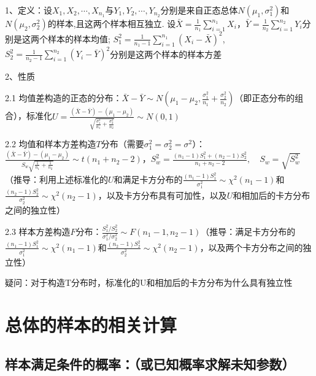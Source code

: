 1、定义：设$X_{1}, X_{2}, \cdots, X_{n_{1}}$与$Y_{1}, Y_{2}, \cdots,Y_{n_{2}}$分别是来自正态总体$N\left(\mu_{1}, \sigma_{1}^{2}\right)$和$N\left(\mu_{2}, \sigma_{2}^{2}\right)$的样本,且这两个样本相互独立. 设$\bar{X}=\frac{1}{n_{1}} \sum_{i=1}^{n_{1}} X_{i}$，$\bar{Y}=\frac{1}{n_{2}} \sum_{i=1}^{n_{2}} Y_{i}$分别是这两个样本的样本均值; $S_{1}^{2}=\frac{1}{n_{1}-1} \sum_{i=1}^{n_{1}}\left(X_{i}-\bar{X}\right)^{2}$, $S_{2}^{2}=\frac{1}{n_{2}-1} \sum_{i=1}^{n_{2}}\left(Y_{i}-\bar{Y}\right)^{2}$分别是这两个样本的样本方差

2、性质

2.1 均值差构造的正态的分布：$\bar{X}-\bar{Y} \sim N\left(\mu_{1}-\mu_{2}, \frac{\sigma_{1}^{2}}{n_{1}}+\frac{\sigma_{2}^{2}}{n_{2}}\right)$（即正态分布的组合），标准化$ U=\frac{(\bar{X}-\bar{Y})-\left(\mu_{1}-\mu_{2}\right)}{\sqrt{\frac{\sigma_{1}^{2}}{n_{1}}+\frac{\sigma_{2}^{2}}{n_{2}}}} \sim N(0,1)$

2.2 均值和样本方差构造$T$分布（需要$\sigma_{1}^{2}=\sigma_{2}^{2}=\sigma^{2}$）：$\frac{(\bar{X}-\bar{Y})-\left(\mu_{1}-\mu_{2}\right)}{S_{w} \sqrt{\frac{1}{n_{1}}+\frac{1}{n_{2}}}} \sim t\left(n_{1}+n_{2}-2\right)$，$S_{w}^{2}=\frac{\left(n_{1}-1\right) S_{1}^{2}+\left(n_{2}-1\right) S_{2}^{2}}{n_{1}+n_{2}-2}, \quad S_{w}=\sqrt{S_{w}^{2}}$（推导：利用上述标准化的$U$和满足卡方分布的$\frac{(n_1-1) S_1^{2}}{\sigma_1^{2}} \sim \chi^{2}(n_1-1)$和$\frac{(n_2-1) S_2^{2}}{\sigma_2^{2}} \sim \chi^{2}(n_2-1)$，以及卡方分布具有可加性，以及$U$和相加后的卡方分布之间的独立性）

2.3 样本方差构造$F$分布：$\frac{S_{1}^{2} / S_{2}^{2}}{\sigma_{1}^{2} / \sigma_{2}^{2}} \sim F\left(n_{1}-1, n_{2}-1\right)$（推导：满足卡方分布的$\frac{(n_1-1) S_1^{2}}{\sigma_1^{2}} \sim \chi^{2}(n_1-1)$和$\frac{(n_2-1) S_2^{2}}{\sigma_2^{2}} \sim \chi^{2}(n_2-1)$，以及两个卡方分布之间的独立性）

疑问：对于构造T分布时，标准化的U和相加后的卡方分布为什么具有独立性

\section{总体的样本的相关计算}



\subsection{样本满足条件的概率：（或已知概率求解未知参数）}


